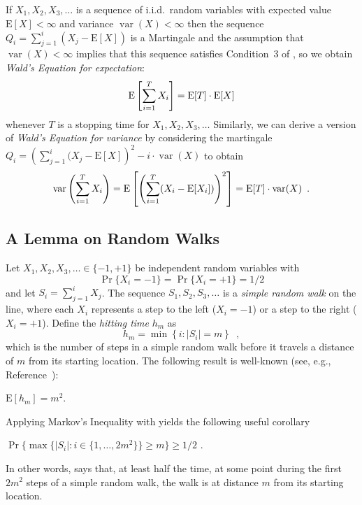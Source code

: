 \documentclass[lotsofwhite]{patmorin}
\newcommand{\E}{\mathrm{E}}
\DeclareMathOperator{\var}{var}
\begin{document}
If $X_1,X_2,X_3,\ldots$ is a sequence of i.i.d.\ random variables with
expected value $\E[X]<\infty$ and variance $\var(X)<\infty$ then 
the sequence $Q_i=\sum_{j=1}^i(X_j-\E[X])$ is a Martingale and the
assumption that $\var(X)<\infty$ implies that this sequence satisfies
Condition~3 of , so we obtain \emph{Wald's Equation
for expectation}:
\begin{equation}
    \E\left[\sum_{i=1}^T X_i \right] = \E[T]\cdot\E[X] \eqlabel{wald-1}
\end{equation}
whenever $T$ is a stopping time for $X_1,X_2,X_3,\ldots$  Similarly,
we can derive a version of \emph{Wald's Equation for variance} by considering 
the martingale 
$Q_i=\left(\sum_{j=1}^i (X_j-\E[X]\right)^2 - i\cdot\var(X)$ 
to obtain
\begin{equation}
    \var\left(\sum_{i=1}^T X_i\right) = \E\left[\left(\sum_{i=1}^T (X_i-\E[X_i])\right)^2 \right] =
\E[T]\cdot\var(X) \enspace . \eqlabel{wald-2}
\end{equation}


\subsection{A Lemma on Random Walks}

Let $X_1,X_2,X_3,\ldots\in\{-1,+1\}$ be independent random variables with
\[ \Pr\{X_i=-1\}=\Pr\{X_i=+1\}=1/2
\]
and let $S_i=\sum_{j=1}^i X_j$.  The sequence $S_1,S_2,S_3,\ldots$ is
a \emph{simple random walk} on the line, where each $X_i$ represents a
step to the left ($X_i=-1$) or a step to the right ($X_i=+1$).
Define the \emph{hitting time} $h_m$ as
\[
   h_m = \min\left\{i:|S_i|= m\right\} \enspace ,
\]
which is the number of steps in a simple random walk
before it travels a distance of $m$ from its starting location.
The following result is well-known (see, e.g.,
Reference~\cite{mu05}):
\begin{lem}
$\E[h_m] = m^2$.
\end{lem}
Applying Markov's Inequality with  yields the
following useful corollary
\begin{cor}
$\Pr\{\max\{|S_i|:i\in\{1,\ldots,2m^2\}\} \ge m\} \ge 1/2$ .
\end{cor}
In other words,  says that, at least half the
time, at some point
during the first $2m^2$ steps of a simple random walk, the 
walk is at distance $m$ from its starting
location.
\end{document}
